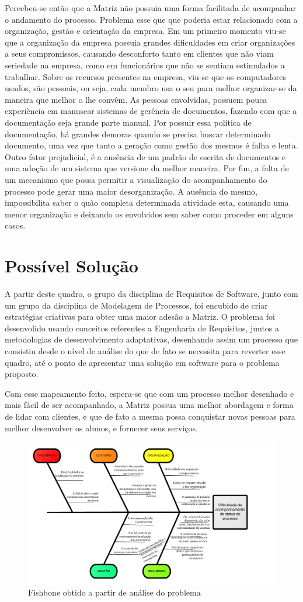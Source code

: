 Percebeu-se então que a Matriz não possuia uma forma facilitada de acompanhar o andamento 
do processo. Problema esse que que poderia estar relacionado com a organização, gestão e 
orientação da empresa. Em um primeiro momento viu-se que a 
organização da empresa possuia grandes dificuldades em criar organizações a seus compromissos, 
causando desconforto tanto em clientes que não viam seriedade na empresa, como em funcionários 
que não se sentiam estimulados a trabalhar. Sobre os recursos presentes na empresa, viu-se que 
os computadores usados, são pessoais, ou seja, cada membro usa o seu para melhor organizar-se 
da maneira que melhor o lhe convêm. As pessoas envolvidas, possuem pouca experiència em manusear 
sistemas de gerência de documentos, fazendo com que a documentação seja grande parte manual. Por 
possuir essa política de documentação, há grandes demoras quando se precisa buscar determinado 
documento, uma vez que tanto a geração como gestão dos mesmos é falha e lenta. Outro fator prejudicial, 
é a ausência de um padrão de escrita de documentos e uma adoção de um sistema que versione da melhor 
maneira. Por fim, a falta de um mecanismo que possa permitir a visualização do acompanhamento do processo
pode gerar uma maior desorganização. A ausência do mesmo, impossibilita saber o quão completa 
determinada atividade esta, causando uma menor organização e deixando os envolvidos sem saber como proceder
em alguns casos.

\section{Possível Solução}
A partir deste quadro, o grupo da disciplina de Requisitos de Software, junto com um 
grupo da disciplina de Modelagem de Processos, foi encubido de criar estratégias 
criativas para obter uma maior adesão a Matriz. O problema foi desenvolido
usando conceitos referentes a Engenharia de Requisitos, juntos a metodologias de 
desenvolvimento adaptativas, desenhando assim um processo que consistiu desde o nível 
de análise do que de fato se necessita para reverter esse quadro, até o ponto de 
apresentar uma solução em software para o problema proposto.

Com esse mapeamento feito, espera-se que com um processo melhor desenhado e mais fácil de ser
acompanhado, a Matriz possua uma melhor abordagem e forma de lidar com clientes, e que de fato
a mesma possa conquistar novas pessoas para melhor desenvolver os alunos, e fornecer seus serviços.

\begin{figure}[!htb]
\centering
\includegraphics[scale=0.4]{figuras/fish.png}
\caption{Fishbone obtido a partir de análise do problema}
\end{figure}